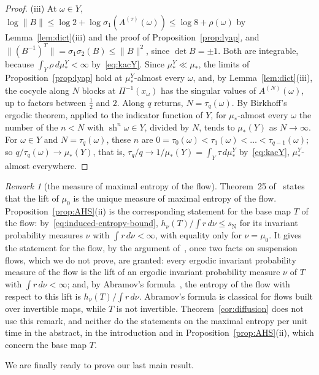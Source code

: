 \documentclass[11pt]{amsart}
\theoremstyle{definition}
\theoremstyle{remark}
\newtheorem{remark}[proposition]{Remark}
\newcommand{\sN}{s_{\mathrm N}}
\newcommand{\norm}[1]{\lVert #1\rVert}
\begin{document}
\begin{proof}
(iii) At $\omega\in Y$, $\log\norm B\le\log2+\log\sigma_1(A^{(\tau)}(\omega))\le\log8+\rho(\omega)$ by Lemma~\ref{lem:dict}(iii) and the proof of Proposition~\ref{prop:lyap}, and $\norm{(B^{-1})^T}=\sigma_1\sigma_2(B)\le\norm B^2$, since $\det B=\pm1$. Both are integrable, because $\int_Y\rho\,d\mu_*^Y<\infty$ by~\eqref{eq:kacY}. Since $\mu_*^Y\ll\mu_*$, the limits of Proposition~\ref{prop:lyap} hold at $\mu_*^Y$-almost every $\omega$, and, by Lemma~\ref{lem:dict}(iii), the cocycle along $N$ blocks at $\Pi^{-1}(x_\omega)$ has the singular values of $A^{(N)}(\omega)$, up to factors between $\frac12$ and $2$. Along $q$ returns, $N=\tau_q(\omega)$. By Birkhoff's ergodic theorem, applied to the indicator function of $Y$, for $\mu_*$-almost every $\omega$ the number of the $n<N$ with $\operatorname{sh}^n\omega\in Y$, divided by $N$, tends to $\mu_*(Y)$ as $N\to\infty$. For $\omega\in Y$ and $N=\tau_q(\omega)$, these $n$ are $0=\tau_0(\omega)<\tau_1(\omega)<\dots<\tau_{q-1}(\omega)$; so $q/\tau_q(\omega)\to\mu_*(Y)$, that is, $\tau_q/q\to1/\mu_*(Y)=\int_Y\tau\,d\mu_*^Y$ by~\eqref{eq:kacY}, $\mu_*^Y$-almost everywhere.
\end{proof}

\begin{remark}[the measure of maximal entropy of the flow]\label{rem:maxentflow}
Theorem~25 of~\cite{AHSinv} states that the lift of $\mu_0$ is the unique measure of maximal entropy of the flow. Proposition~\ref{prop:AHS}(ii) is the corresponding statement for the base map $T$ of the flow: by~\eqref{eq:induced-entropy-bound}, $h_\nu(T)/\int r\,d\nu\le\sN$ for its invariant probability measures $\nu$ with $\int r\,d\nu<\infty$, with equality only for $\nu=\mu_0$. It gives the statement for the flow, by the argument of~\cite[proof of Thm.~25]{AHSinv}, once two facts on suspension flows, which we do not prove, are granted: every ergodic invariant probability measure of the flow is the lift of an ergodic invariant probability measure $\nu$ of $T$ with $\int r\,d\nu<\infty$; and, by Abramov's formula~\cite{Abr59b}, the entropy of the flow with respect to this lift is $h_\nu(T)/\int r\,d\nu$. Abramov's formula is classical for flows built over invertible maps, while $T$ is not invertible. Theorem~\ref{cor:diffusion} does not use this remark, and neither do the statements on the maximal entropy per unit time in the abstract, in the introduction and in Proposition~\ref{prop:AHS}(ii), which concern the base map $T$.
\end{remark}

We are finally ready to prove our last main result.
\end{document}
